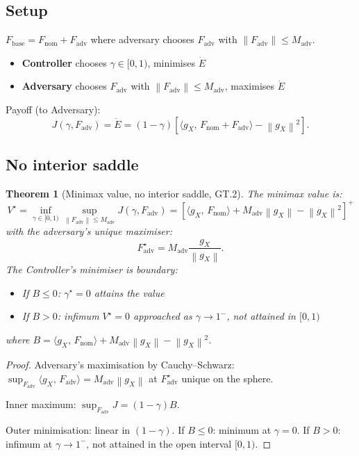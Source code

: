 \documentclass[11pt,a4paper]{article}
\newtheorem{theorem}{Theorem}[section]
\theoremstyle{definition}
\newcommand{\norm}[1]{\left\|#1\right\|}
\newcommand{\inner}[2]{\langle #1,\,#2\rangle}
\newcommand{\Fbase}{F_{\mathrm{base}}}
\newcommand{\gX}{g_X}
\newcommand{\adv}{\mathrm{adv}}
\newcommand{\nom}{\mathrm{nom}}
\begin{document}
\subsection{Setup}

$\Fbase = F_\nom + F_\adv$ where adversary chooses $F_\adv$ with $\norm{F_\adv} \leq M_\adv$.

\begin{itemize}
\item \textbf{Controller} chooses $\gamma \in [0,1)$, minimises $\dot E$
\item \textbf{Adversary} chooses $F_\adv$ with $\norm{F_\adv} \leq M_\adv$, maximises $\dot E$
\end{itemize}

Payoff (to Adversary):
\[
J(\gamma, F_\adv) = \dot E = (1-\gamma)\left[\inner{\gX}{F_\nom + F_\adv} - \norm{\gX}^2\right].
\]

\subsection{No interior saddle}

\begin{theorem}[Minimax value, no interior saddle, GT.2]
The minimax value is:
\[
V^\star = \inf_{\gamma\in[0,1)}\sup_{\norm{F_\adv}\leq M_\adv} J(\gamma, F_\adv) = \left[\inner{\gX}{F_\nom} + M_\adv\norm{\gX} - \norm{\gX}^2\right]^+
\]
with the adversary's unique maximiser:
\[
F_\adv^\star = M_\adv\frac{\gX}{\norm{\gX}}.
\]
The Controller's minimiser is boundary:
\begin{itemize}
\item If $B \leq 0$: $\gamma^\star = 0$ attains the value
\item If $B > 0$: infimum $V^\star = 0$ approached as $\gamma \to 1^-$, not attained in $[0,1)$
\end{itemize}
where $B = \inner{\gX}{F_\nom} + M_\adv\norm{\gX} - \norm{\gX}^2$.
\end{theorem}

\begin{proof}
Adversary's maximisation by Cauchy--Schwarz: $\sup_{F_\adv}\inner{\gX}{F_\adv} = M_\adv\norm{\gX}$ at $F_\adv^\star$ unique on the sphere.

Inner maximum: $\sup_{F_\adv}J = (1-\gamma)B$.

Outer minimisation: linear in $(1-\gamma)$.
If $B\leq 0$: minimum at $\gamma = 0$.
If $B > 0$: infimum at $\gamma \to 1^-$, not attained in the open interval $[0,1)$.
\end{proof}
\end{document}
